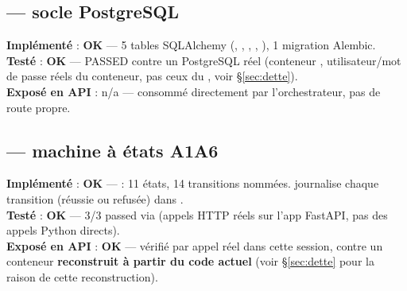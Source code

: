 \documentclass[11pt,a4paper]{article}
\newcommand{\etat}[2]{\textbf{#1} : #2}
\newcommand{\ok}{\textcolor{green!45!black}{\textbf{OK}}}
\begin{document}
\subsection{ --- socle PostgreSQL}
\etat{Impl\'ement\'e}{\ok} --- 5 tables SQLAlchemy (, , , , ), 1 migration Alembic.\\
\etat{Test\'e}{\ok} ---  PASSED contre un PostgreSQL r\'eel (conteneur , utilisateur/mot de passe r\'eels du conteneur, pas ceux du , voir \S\ref{sec:dette}).\\
\etat{Expos\'e en API}{n/a} --- consomm\'e directement par l'orchestrateur, pas de route propre.

\subsection{ --- machine \`a \'etats A1\textrightarrow A6}
\label{sec:orchestrateur}
\etat{Impl\'ement\'e}{\ok} ---  : 11 \'etats, 14 transitions nomm\'ees.  journalise chaque transition (r\'eussie ou refus\'ee) dans .\\
\etat{Test\'e}{\ok} --- 3/3 passed via  (appels HTTP r\'eels sur l'app FastAPI, pas des appels Python directs).\\
\etat{Expos\'e en API}{\ok} --- v\'erifi\'e par appel r\'eel dans cette session, contre un conteneur \textbf{reconstruit \`a partir du code actuel} (voir \S\ref{sec:dette} pour la raison de cette reconstruction).
\end{document}
